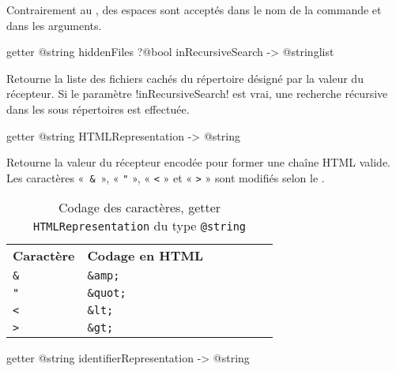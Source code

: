 Contrairement au , des espaces sont acceptés dans le nom de la commande et dans les arguments.









\begin{galgas3box}
getter @string hiddenFiles ?@bool inRecursiveSearch -> @stringlist
\end{galgas3box}

Retourne la liste des fichiers cachés du répertoire désigné par la valeur du récepteur. Si le paramètre \ggst!inRecursiveSearch! est vrai, une recherche récursive dans les sous répertoires est effectuée.











\begin{galgas3box}
getter @string HTMLRepresentation -> @string
\end{galgas3box}
Retourne la valeur du récepteur encodée pour former une chaîne HTML valide. Les caractères «~\texttt{\&}~», « \texttt{"} », « \texttt{<} » et « \texttt{>} » sont modifiés selon le .


\begin{table}[t]
  \centering
  \begin{tabular}{lllllll}
  \textbf{Caractère} & \textbf{Codage en HTML} \\
  \texttt{\&} & \texttt{\&amp;} \\
  \texttt{"} & \texttt{\&quot;} \\
  \texttt{<} & \texttt{\&lt;} \\
  \texttt{>} & \texttt{\&gt;} \\
  \end{tabular}
  \caption{Codage des caractères, getter \texttt{HTMLRepresentation} du type \texttt{@string}}
\end{table}







\begin{galgas3box}
getter @string identifierRepresentation -> @string
\end{galgas3box}

